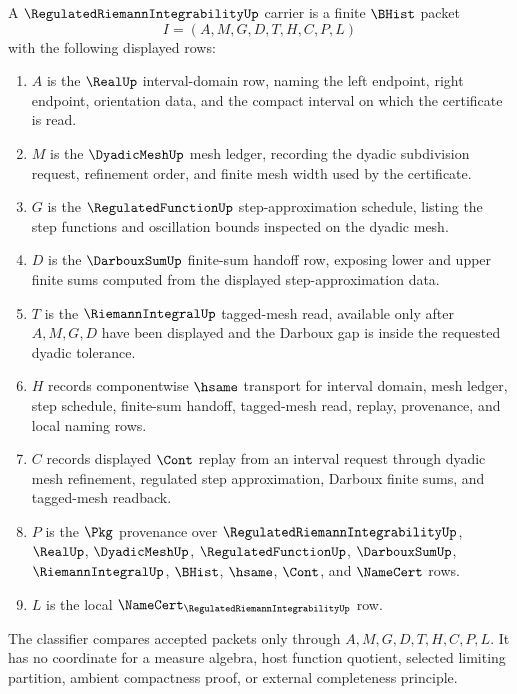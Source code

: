 \begin{definition}
\label{def:regulated-riemann-integrability-carrier}
A $\RegulatedRiemannIntegrabilityUp$ carrier is a finite $\BHist$ packet
$$
I=(A,M,G,D,T,H,C,P,L)
$$
with the following displayed rows:
\begin{enumerate}
\item $A$ is the $\RealUp$ interval-domain row, naming the left endpoint, right endpoint, orientation data, and the compact interval on which the certificate is read.
\item $M$ is the $\DyadicMeshUp$ mesh ledger, recording the dyadic subdivision request, refinement order, and finite mesh width used by the certificate.
\item $G$ is the $\RegulatedFunctionUp$ step-approximation schedule, listing the step functions and oscillation bounds inspected on the dyadic mesh.
\item $D$ is the $\DarbouxSumUp$ finite-sum handoff row, exposing lower and upper finite sums computed from the displayed step-approximation data.
\item $T$ is the $\RiemannIntegralUp$ tagged-mesh read, available only after $A,M,G,D$ have been displayed and the Darboux gap is inside the requested dyadic tolerance.
\item $H$ records componentwise $\hsame$ transport for interval domain, mesh ledger, step schedule, finite-sum handoff, tagged-mesh read, replay, provenance, and local naming rows.
\item $C$ records displayed $\Cont$ replay from an interval request through dyadic mesh refinement, regulated step approximation, Darboux finite sums, and tagged-mesh readback.
\item $P$ is the $\Pkg$ provenance over $\RegulatedRiemannIntegrabilityUp$, $\RealUp$, $\DyadicMeshUp$, $\RegulatedFunctionUp$, $\DarbouxSumUp$, $\RiemannIntegralUp$, $\BHist$, $\hsame$, $\Cont$, and $\NameCert$ rows.
\item $L$ is the local $\NameCert_{\RegulatedRiemannIntegrabilityUp}$ row.
\end{enumerate}
The classifier compares accepted packets only through $A,M,G,D,T,H,C,P,L$. It has no coordinate for a measure algebra, host function quotient, selected limiting partition, ambient compactness proof, or external completeness principle.
\end{definition}

